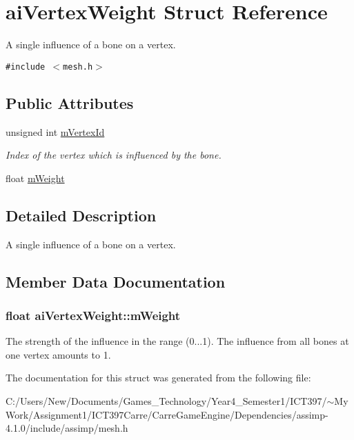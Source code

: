 \hypertarget{structai_vertex_weight}{
\section{aiVertexWeight Struct Reference}
\label{structai_vertex_weight}
}
A single influence of a bone on a vertex.  


{\tt \#include $<$mesh.h$>$}

\subsection*{Public Attributes}
\begin{CompactItemize}
\item 
\hypertarget{structai_vertex_weight_f6269cf6a0f02e5ae870a72046d58f4f}{
unsigned int \hyperlink{structai_vertex_weight_f6269cf6a0f02e5ae870a72046d58f4f}{mVertexId}}
\label{structai_vertex_weight_f6269cf6a0f02e5ae870a72046d58f4f}

\begin{CompactList}\small\item\em Index of the vertex which is influenced by the bone. \item\end{CompactList}\item 
float \hyperlink{structai_vertex_weight_bab9c49baabc2cafef9ac840f59e61b8}{mWeight}
\end{CompactItemize}


\subsection{Detailed Description}
A single influence of a bone on a vertex. 

\subsection{Member Data Documentation}
\hypertarget{structai_vertex_weight_bab9c49baabc2cafef9ac840f59e61b8}{
\subsubsection[mWeight]{\setlength{\rightskip}{0pt plus 5cm}float {\bf aiVertexWeight::mWeight}}}
\label{structai_vertex_weight_bab9c49baabc2cafef9ac840f59e61b8}


The strength of the influence in the range (0...1). The influence from all bones at one vertex amounts to 1. 

The documentation for this struct was generated from the following file:\begin{CompactItemize}
\item 
C:/Users/New/Documents/Games\_\-Technology/Year4\_\-Semester1/ICT397/$\sim$My Work/Assignment1/ICT397Carre/CarreGameEngine/Dependencies/assimp-4.1.0/include/assimp/mesh.h\end{CompactItemize}

